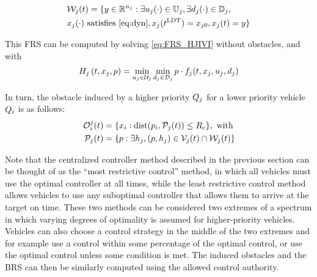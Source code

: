 \begin{equation}
\label{eq:FRS2}
\begin{aligned}
&\mathcal{W}_j(t) = \{y \in \mathbb{R}^{n_j}: \exists u_j(\cdot)\in\mathbb{U}_j, \exists d_j(\cdot) \in \mathbb{D}_j, \\
&x_j(\cdot) \text{ satisfies \eqref{eq:dyn}}, x_j(t^\text{LDT}) = x_{j0}, x_j(t) = y\}
\end{aligned}
\end{equation}

This FRS can be computed by solving \eqref{eq:FRS_HJIVI} without obstacles, and with
\vspace{-0.4em}
\begin{equation}
H_j\left(t, x_j, p\right) = \min_{u_j \in \mathcal{U}_j} \min_{d_j \in \mathcal{D}_j} p \cdot f_j(t, x_j, u_j, d_j)
\end{equation}

In turn, the obstacle induced by a higher priority $Q_j$ for a lower priority vehicle $Q_i$ is as follows:
\vspace{-0.4em}
\begin{equation}
\begin{aligned}
\mathcal{O}_i^j(t) &= \{x_i: \text{dist}(p_i, \mathcal{P}_j(t)) \le R_c \}, \text{ with} \\
\mathcal{P}_j(t) &= \{p: \exists h_j, (p, h_j) \in \mathcal{V}_j(t) \cap \mathcal{W}_j(t)\}
\end{aligned}
\end{equation}

Note that the centralized controller method described in the previous section can be thought of as the ``most restrictive control'' method, in which all vehicles must use the optimal controller at all times, while the least restrictive control method allows vehicles to use any suboptimal controller that allows them to arrive at the target on time. These two methods can be considered two extremes of a spectrum in which varying degrees of optimality is assumed for higher-priority vehicles. Vehicles can also choose a control strategy in the middle of the two extremes and for example use a control within some percentage of the optimal control, or use the optimal control unless some condition is met. The induced obstacles and the BRS can then be similarly computed using the allowed control authority.